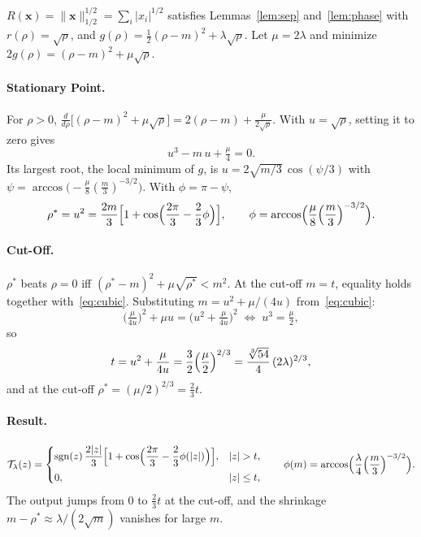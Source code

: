 \documentclass[11pt,a4paper]{article}
\theoremstyle{definition}
\DeclareMathOperator{\sgn}{sgn}
\begin{document}
$R(\mathbf x) = \lVert\mathbf x\rVert_{1/2}^{1/2} = \sum_i |x_i|^{1/2}$ satisfies Lemmas~\ref{lem:sep} and~\ref{lem:phase} with $r(\rho) = \sqrt\rho$, and
$g(\rho) = \tfrac12(\rho-m)^2 + \lambda\sqrt\rho$. Let $\mu = 2\lambda$ and minimize
$2g(\rho) = (\rho-m)^2 + \mu\sqrt\rho$.

\paragraph{Stationary Point.}
For $\rho>0$, $\tfrac{d}{d\rho}\bigl[(\rho-m)^2+\mu\sqrt\rho\bigr] = 2(\rho-m)+\tfrac{\mu}{2\sqrt\rho}$.
With $u=\sqrt\rho$, setting it to zero gives
\begin{equation}\label{eq:cubic}
  u^3 - m\,u + \tfrac{\mu}{4} = 0 .
\end{equation}
Its largest root, the local minimum of $g$, is
$u = 2\sqrt{m/3}\,\cos(\psi/3)$ with $\psi = \arccos\bigl(-\tfrac{\mu}{8}(\tfrac m3)^{-3/2}\bigr)$.
With $\phi = \pi-\psi$,
\begin{equation}\label{eq:half-rho}
  \rho^\ast = u^2 = \frac{2m}{3}\Bigl[1+\cos\Bigl(\frac{2\pi}{3}-\frac{2}{3}\phi\Bigr)\Bigr],
  \qquad \phi = \arccos\Bigl(\frac{\mu}{8}\Bigl(\frac m3\Bigr)^{-3/2}\Bigr).
\end{equation}

\paragraph{Cut-Off.}
$\rho^\ast$ beats $\rho=0$ iff $(\rho^\ast-m)^2+\mu\sqrt{\rho^\ast} < m^2$. At the cut-off $m=t$,
equality holds together with~\eqref{eq:cubic}. Substituting $m = u^2+\mu/(4u)$ from~\eqref{eq:cubic}:
\[
  \bigl(\tfrac{\mu}{4u}\bigr)^2 + \mu u = \bigl(u^2+\tfrac{\mu}{4u}\bigr)^2
  \;\Longleftrightarrow\; u^3 = \tfrac{\mu}{2},
\]
so
\begin{equation}\label{eq:half-t}
  t = u^2+\frac{\mu}{4u} = \frac32\Bigl(\frac{\mu}{2}\Bigr)^{2/3}
  = \frac{\sqrt[3]{54}}{4}\,(2\lambda)^{2/3},
\end{equation}
and at the cut-off $\rho^\ast = (\mu/2)^{2/3} = \tfrac23 t$.

\paragraph{Result.}
\begin{equation}\label{eq:half}
  \mathcal T_\lambda(z) = \begin{cases}
    \sgn(z)\,\dfrac{2|z|}{3}\Bigl[1+\cos\Bigl(\dfrac{2\pi}{3}-\dfrac{2}{3}\phi(|z|)\Bigr)\Bigr], & |z|>t,\\[1.5ex]
    0, & |z|\le t,\end{cases}
  \qquad \phi(m) = \arccos\Bigl(\frac{\lambda}{4}\Bigl(\frac m3\Bigr)^{-3/2}\Bigr).
\end{equation}
The output jumps from $0$ to $\tfrac23 t$ at the cut-off, and the shrinkage
$m-\rho^\ast \approx \lambda/(2\sqrt m)$ vanishes for large $m$.
\end{document}
